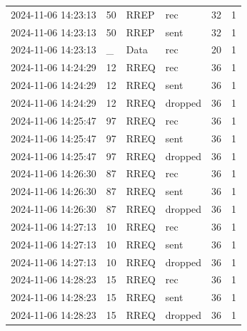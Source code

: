 \documentclass[]{nsm-thesis}
\begin{document}
\begin{longtable}{llllll}
2024-11-06 14:23:13 & 50 & RREP & rec & 32 & 1 \\
2024-11-06 14:23:13 & 50 & RREP & sent & 32 & 1 \\
2024-11-06 14:23:13 & _ & Data & rec & 20 & 1 \\
2024-11-06 14:24:29 & 12 & RREQ & rec & 36 & 1 \\
2024-11-06 14:24:29 & 12 & RREQ & sent & 36 & 1 \\
2024-11-06 14:24:29 & 12 & RREQ & dropped & 36 & 1 \\
2024-11-06 14:25:47 & 97 & RREQ & rec & 36 & 1 \\
2024-11-06 14:25:47 & 97 & RREQ & sent & 36 & 1 \\
2024-11-06 14:25:47 & 97 & RREQ & dropped & 36 & 1 \\
2024-11-06 14:26:30 & 87 & RREQ & rec & 36 & 1 \\
2024-11-06 14:26:30 & 87 & RREQ & sent & 36 & 1 \\
2024-11-06 14:26:30 & 87 & RREQ & dropped & 36 & 1 \\
2024-11-06 14:27:13 & 10 & RREQ & rec & 36 & 1 \\
2024-11-06 14:27:13 & 10 & RREQ & sent & 36 & 1 \\
2024-11-06 14:27:13 & 10 & RREQ & dropped & 36 & 1 \\
2024-11-06 14:28:23 & 15 & RREQ & rec & 36 & 1 \\
2024-11-06 14:28:23 & 15 & RREQ & sent & 36 & 1 \\
2024-11-06 14:28:23 & 15 & RREQ & dropped & 36 & 1 \\
\bottomrule
\end{longtable}
\end{document}
